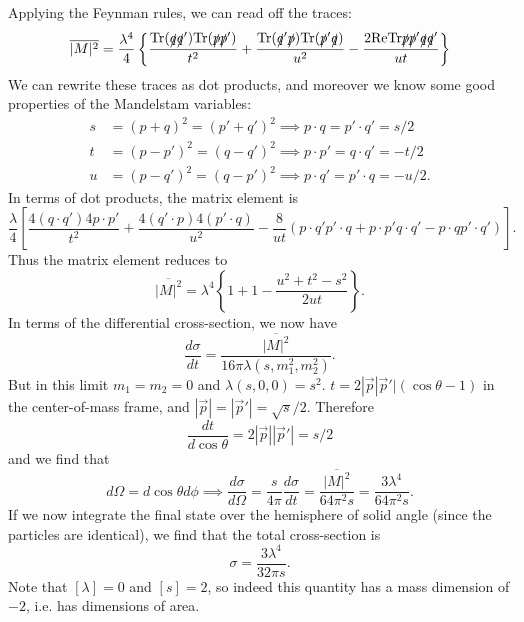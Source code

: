 Applying the Feynman rules, we can read off the traces:
$$\overline{|M|^2}=\frac{\lambda^4}{4}\left\{\frac{\text{Tr}(\slashed q \slashed q')\text{Tr}(\slashed p \slashed p')}{t^2}+
\frac{\text{Tr}(\slashed q' \slashed p)\text{Tr}(\slashed p' \slashed q)}{u^2}
-\frac{2\text{Re}\text{Tr}\slashed p \slashed p' \slashed q \slashed q'}{ut}\right\}$$
We can rewrite these traces as dot products, and moreover we know some good properties of the Mandelstam variables:
\begin{align*}
    s&=(p+q)^2=(p'+q')^2 \implies p\cdot q = p'\cdot q'=s/2\\
    t&=(p-p')^2=(q-q')^2 \implies p\cdot p' = q\cdot q' =-t/2\\
    u&=(p-q')^2=(q-p')^2 \implies p\cdot q'=p'\cdot q=-u/2.
\end{align*}
In terms of dot products, the matrix element is
$$\frac{\lambda}{4}\left[\frac{4(q\cdot q')4 p \cdot p'}{t^2}+\frac{4(q'\cdot p)4(p'\cdot q)}{u^2}-\frac{8}{ut}(p\cdot q' p'\cdot q+p\cdot p' q \cdot q' -p\cdot q p'\cdot q')\right].$$
Thus the matrix element reduces to
$$\overline{|M|^2}=\lambda^4\left\{1+1-\frac{u^2+t^2-s^2}{2ut}\right\}.$$
In terms of the differential cross-section, we now have
$$\frac{d\sigma}{dt}=\frac{\overline{|M|^2}}{16\pi \lambda(s,m_1^2,m_2^2)}.$$
But in this limit $m_1=m_2=0$ and $\lambda(s,0,0)=s^2$. $t=2|\vec p| \vec p'|(\cos\theta-1)$ in the center-of-mass frame, and $|\vec p|=|\vec p'|=\sqrt{s}/2.$ Therefore
$$\frac{dt}{d\cos\theta}=2|\vec p||\vec p'|=s/2$$ and we find that
$$d\Omega = d\cos\theta d\phi \implies \frac{d\sigma}{d\Omega}=\frac{s}{4\pi}\frac{d\sigma}{dt}=\frac{\overline{|M|^2}}{64\pi^2 s}=\frac{3\lambda^4}{64\pi^2 s}.$$
If we now integrate the final state over the hemisphere of solid angle (since the particles are identical), we find that the total cross-section is
$$\sigma=\frac{3\lambda^4}{32\pi s}.$$
Note that $[\lambda]=0$ and $[s]=2$, so indeed this quantity has a mass dimension of $-2$, i.e. has dimensions of area.